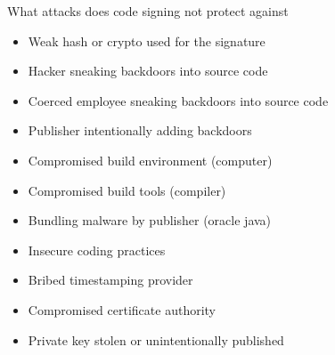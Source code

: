 \documentclass[11pt]{beamer}
\begin{document}
\begin{frame}{What attacks does code signing not protect against}
\begin{itemize}
\item Weak hash or crypto used for the signature            %
\item Hacker sneaking backdoors into source code            %
\item Coerced employee sneaking backdoors into source code  %
\item Publisher intentionally adding backdoors              %
\item Compromised build environment (computer)              %
\item Compromised build tools (compiler)                    %
\item Bundling malware by publisher (oracle java)
\item Insecure coding practices
\item Bribed timestamping provider                          %
\item Compromised certificate authority
\item Private key stolen or unintentionally published
\end{itemize}
\end{frame}
\end{document}
